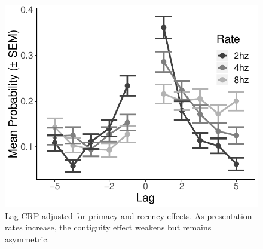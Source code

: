 \documentclass[10pt,letterpaper]{article}
\begin{document}
\begin{figure}[H]
\begin{center}
\includegraphics[width = .4\textwidth]{CRP_adjusted.pdf}
\end{center}
\caption{Lag CRP adjusted for primacy and recency effects. As presentation rates increase, the contiguity effect weakens but remains asymmetric.} 
\label{CRP}
\end{figure}

\nocite{GudeEtal09}




\setlength{\bibleftmargin}{.125in}
\setlength{\bibindent}{-\bibleftmargin}


\end{document}
